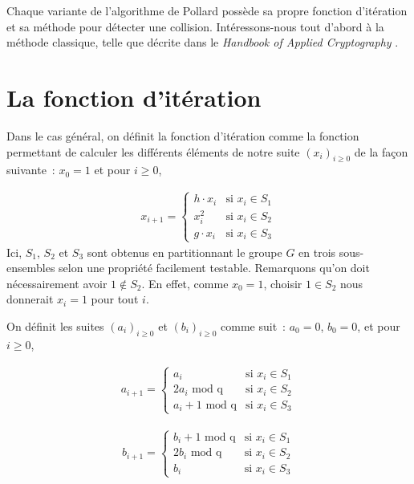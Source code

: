     	Chaque variante de l'algorithme de Pollard possède sa propre fonction d'itération et sa méthode pour détecter une collision. Intéressons-nous tout d'abord à la méthode classique, telle que décrite dans le \textit{Handbook of Applied Cryptography} \autocite[106]{handbook}.

        \section{La fonction d'itération}
        Dans le cas général, on définit la fonction d'itération comme la fonction permettant de calculer les différents éléments de notre suite $(x_i)_{i \ge 0}$ de la façon suivante~: $x_0 = 1$ et pour $i \geq 0$,

        \begin{align*}
          x_{i+1} =
          \begin{cases}
            h \cdot x_i & \text{si } x_i \in S_1 \\
            x_i^2 & \text{si } x_i \in S_2 \\
            g \cdot x_i & \text{si } x_i \in S_3
          \end{cases}
        \end{align*}
        Ici, $S_1$, $S_2$ et $S_3$ sont obtenus en partitionnant le groupe $G$ en trois sous-ensembles selon une propriété facilement testable. Remarquons qu'on doit nécessairement avoir $1 \notin S_2$. En effet, comme $x_0 = 1$, choisir $1 \in S_2$ nous donnerait $x_i = 1$ pour tout $i$.

        On définit les suites ${(a_i)}_{i \geq 0}$ et ${(b_i)}_{i \geq 0}$ comme suit~: $a_0 = 0$, $b_0 = 0$, et pour $i \geq 0$,

        \begin{align*}
          a_{i+1} =
          \begin{cases}
            a_i                   & \text{si } x_i \in S_1 \\
            2a_i \text{\ mod q}    & \text{si } x_i \in S_2 \\
            a_i + 1 \text{\ mod q} & \text{si } x_i \in S_3
          \end{cases}
        \end{align*}

        \begin{align*}
          b_{i+1} =
          \begin{cases}
            b_i + 1 \text{\ mod q} & \text{si } x_i \in S_1 \\
            2b_i \text{\ mod q}    & \text{si } x_i \in S_2 \\
            b_i                   & \text{si } x_i \in S_3
          \end{cases}
        \end{align*}

